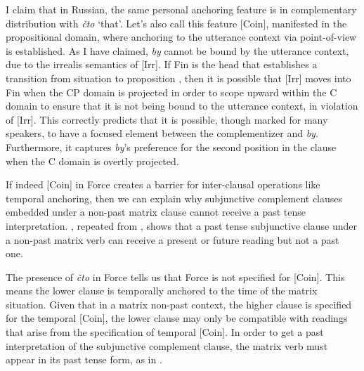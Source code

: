 \documentclass[output=paper,
modfonts,
newtxmath,
hidelinks,
]{langscibook}
\begin{document}
I claim that in Russian, the same personal anchoring feature is in complementary distribution with \textit{čto} `that'. Let’s also call this feature [Coin], manifested in the propositional domain, where anchoring to the utterance context via point-of-view is established. As I have claimed, \textit{by} cannot be bound by the utterance context, due to the irrealis semantics of [Irr]. If Fin is the head that establishes a transition from situation to proposition \citep{RamchandSvenonius2014}, then it is possible that [Irr] moves into Fin when the CP domain is projected in order to scope upward within the C domain to ensure that it is not being bound to the utterance context, in violation of [Irr]. This correctly predicts that it is possible, though marked for many speakers, to have a focused element between the complementizer and \textit{by}. Furthermore, it captures \textit{by}’s preference for the second position in the clause when the C domain is overtly projected. 

If indeed [Coin] in Force creates a barrier for inter-clausal operations like temporal anchoring, then we can explain why subjunctive complement clauses embedded under a non-past matrix clause cannot receive a past tense interpretation. , repeated from , shows that a past tense subjunctive clause under a non-past matrix verb can receive a present or future reading but not a past one.

\ea \label{ex33}
    \hfill \citep[8]{Asarina2006}
	\z
\z

\noindent The presence of \textit{čto} in Force tells us that Force is not specified for [Coin]. This means the lower clause is temporally anchored to the time of the matrix situation. Given that in a matrix non-past context, the higher clause is specified for the temporal [Coin], the lower clause may only be compatible with readings that arise from the specification of temporal [Coin]. In order to get a past interpretation of the subjunctive complement clause, the matrix verb must appear in its past tense form, as in .
\end{document}
